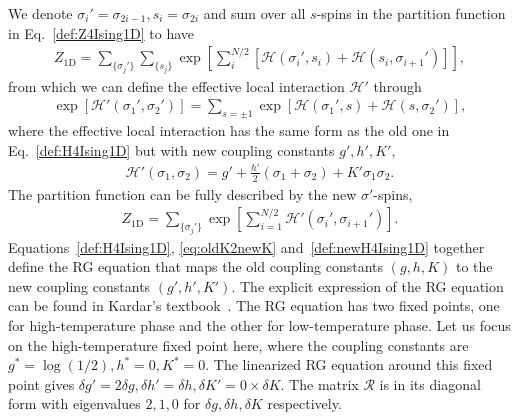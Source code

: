 \documentclass[aps,prr,reprint,superscriptaddress,floatfix]{revtex4-2}
\begin{document}
We denote $\sigma_i'=\sigma_{2i-1}, s_i = \sigma_{2i}$ and sum over all $s$-spins in the partition function in Eq.~\eqref{def:Z4Ising1D} to have
%
\begin{align}\label{eq:oldK2newKZ}
    Z_{\text{1D}} = 
    \sum_{\{\sigma_j'\}} \sum_{\{s_j \}}
    \exp{\left[ \sum_i^{N/2} \left[\mathscr{H}\left(\sigma_i',s_i\right)
    + \mathscr{H}\left(s_i,\sigma_{i+1}'\right)\right]\right]},
\end{align}
%
from which we can define the effective local interaction $\mathscr{H}'$ through
%
\begin{align}\label{eq:oldK2newK}
    \exp{\left[\mathscr{H}'\left(\sigma_1',\sigma_2'\right)\right]} =
    \sum_{s=\pm 1}\exp{\left[\mathscr{H}\left(\sigma_1',s\right) +
        \mathscr{H}\left(s,\sigma_2'\right)\right]},
\end{align}
%
where the effective local interaction has the same form as the old one in Eq.~\eqref{def:H4Ising1D} but with new coupling constants $g',h',K'$,
%
\begin{align}\label{def:newH4Ising1D}
    \mathscr{H}'\left(\sigma_1,\sigma_2\right) = g' +
    \frac{h'}{2}\left(\sigma_1 + \sigma_2\right) + K' \sigma_1 \sigma_2.
\end{align}
%
The partition function can be fully described by the new $\sigma'$-spins,
%
\begin{align}\label{eq:Z2Ising1Dnew}
    Z_{\text{1D}} = \sum_{\{\sigma_j'\}}
    \exp{\left[\sum_{i=1}^{N/2}\mathscr{H}'\left(\sigma_i',\sigma_{i+1}'\right)\right]}.
\end{align}
%
Equations~\eqref{def:H4Ising1D}, \eqref{eq:oldK2newK} and~\eqref{def:newH4Ising1D} together define the RG equation that maps the old coupling constants $(g,h,K)$ to the new coupling constants $(g',h',K')$. 
The explicit expression of the RG equation can be found in Kardar's textbook~\cite{kardar2007}. 
The RG equation has two fixed points, one for high-temperature phase and the other for low-temperature phase. 
Let us focus on the high-temperature fixed point here, where the coupling constants are $g^* = \log\left(1/2\right),h^*=0,K^*=0$. 
The linearized RG equation around this fixed point gives $\delta g' = 2\delta g, \delta h' = \delta h, \delta K' = 0\times \delta K$. 
The matrix $\mathcal{R}$ is in its diagonal form with eigenvalues $2,1,0$ for $\delta g,\delta h,\delta K$ respectively.
%
\end{document}
